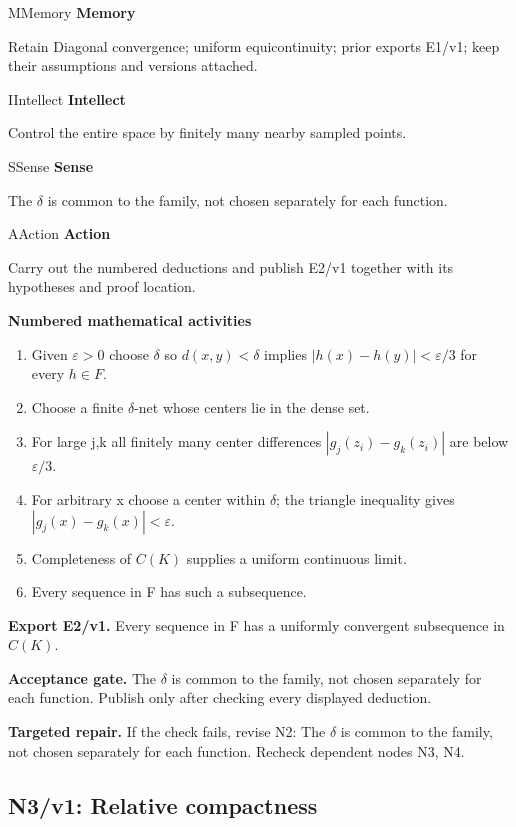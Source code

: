 \documentclass[preprint,12pt,aps,pra,showkeys,amsmath,amssymb,superscriptaddress,floatfix]{revtex4-2}
\theoremstyle{definition}
\theoremstyle{remark}
\newcommand{\mmfaculty}[3]{%
 \begin{mmfacultybox}{#1}{#2}
 {\sffamily\bfseries\color{MMBlue}#2}\par\smallskip #3
 \end{mmfacultybox}}
\newcommand{\field}[2]{\par\smallskip\noindent\textbf{#1.} #2\par}
\begin{document}
\mmfaculty{M}{Memory}{Retain Diagonal convergence; uniform equicontinuity; prior exports
E1/v1; keep their assumptions and versions attached.}

\mmfaculty{I}{Intellect}{Control the entire space by finitely many nearby sampled points.}

\mmfaculty{S}{Sense}{The \(\delta\) is common to the family, not chosen separately for each
function.}

\mmfaculty{A}{Action}{Carry out the numbered deductions and publish E2/v1 together with its
hypotheses and proof location.}

\smallskip\noindent\textbf{Numbered mathematical activities}

\begin{enumerate}[label=N2.\arabic*,leftmargin=3.4em]

\item Given \(\varepsilon >0\) choose \(\delta\) so \(d(x,y)<\delta\) implies
\(|h(x)-h(y)|<\varepsilon /3\) for every \(h\in F\).

\item Choose a finite \(\delta\)-net whose centers lie in the dense set.

\item For large j,k all finitely many center differences
\(|g_j(z_i)-g_k(z_i)|\) are below \(\varepsilon /3\).

\item For arbitrary x choose a center within \(\delta\); the triangle
inequality gives \(|g_j(x)-g_k(x)|<\varepsilon\).

\item Completeness of \(C(K)\) supplies a uniform continuous limit.

\item Every sequence in F has such a subsequence.

\end{enumerate}

\field{Export E2/v1}{Every sequence in F has a uniformly convergent subsequence in \(C(K)\).}

\field{Acceptance gate}{The \(\delta\) is common to the family, not chosen separately for each
function. Publish only after checking every displayed deduction.}

\field{Targeted repair}{If the check fails, revise N2: The \(\delta\) is common to the family,
not chosen separately for each function. Recheck dependent nodes N3, N4.}

\clearpage

\subsection{N3/v1: Relative compactness}
\end{document}
